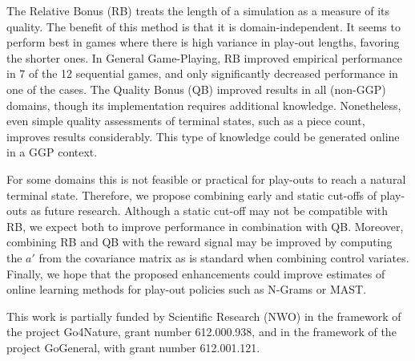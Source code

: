 \documentclass{ecai2014}
\begin{document}
The Relative Bonus (RB) treats the length of a simulation as a measure of its quality. The benefit of this method is that it is domain-independent. It seems to perform best in games where there is high variance in play-out lengths, favoring the shorter ones. 
In General Game-Playing, RB improved empirical performance in 7 of the 12 sequential games, 
and only significantly decreased performance in one of the cases. 
The Quality Bonus (QB) improved results in all (non-GGP) domains, though its implementation requires additional knowledge. Nonetheless, even simple quality assessments of terminal states, such as a piece count, improves results considerably. This type of knowledge could be generated online in a GGP context. 

For some domains this is not feasible or practical for play-outs to reach a natural terminal state. Therefore, we propose combining early and static cut-offs of play-outs as future research. Although a static cut-off may not be compatible with RB, we expect both to improve performance in combination with QB. Moreover, combining RB and QB with the reward signal may be improved by computing the $a'$ from the covariance matrix as is standard when combining control variates. 
Finally, we hope that the proposed enhancements could improve estimates of online learning methods for play-out policies such as N-Grams or MAST. %

\ack This work is partially funded by Scientific Research (NWO) in the framework of the project Go4Nature, grant number 612.000.938, and in the framework of the project GoGeneral, with grant number 612.001.121.


\end{document}
